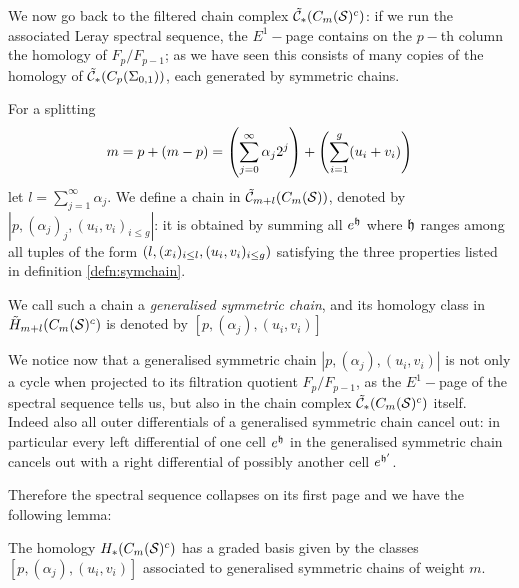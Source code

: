 We now go back to the filtered chain complex $\tilde{\mathcal{C}}_*(C_m(\mathcal{S})^c)$:
if we run the associated Leray spectral sequence,
the $E^1-$page contains on the $p-$th column the homology of $F_p/F_{p-1}$; as we have seen this consists of
many copies of the homology of $\tilde{\mathcal{C}}_*(C_p(\Sigma_{0,1}))$, each generated by symmetric chains.

\begin{defn}
\label{defn:gensymchain}
For a splitting
\[
 m=p+(m-p)=\left(\sum_{j=0}^{\infty}\alpha_j2^j\right)+\left(\sum_{i=1}^g(u_i+v_i)\right)
\]
let $l=\sum_{j=1}^{\infty}\alpha_j$. We define a chain in
$\tilde{\mathcal{C}}_{m+l}(C_m(\mathcal{S}))$, denoted by $|p,(\alpha_j)_j,(u_i,v_i)_{i\leq g}|$: it
is obtained by summing all $e^{\mathfrak{h}}$ where $\mathfrak{h}$
ranges among all tuples of the form $\left(l,(x_i)_{i\leq l},(u_i,v_i)_{i\leq g}\right)$
satisfying the three properties listed in definition \ref{defn:symchain}.

We call such a chain a
\emph{generalised symmetric chain}, and its homology class in $\tilde{H}_{m+l}(C_m(\mathcal{S})^c)$ is denoted
by $[p,(\alpha_j),(u_i,v_i)]$
\end{defn}

We notice now that a generalised symmetric chain $|p,(\alpha_j),(u_i,v_i)|$
is not only
a cycle when projected to its filtration quotient $F_p/F_{p-1}$, as the $E^1-$page
of the spectral sequence tells us, but also
in the chain complex $\tilde{\mathcal{C}}_*(C_m(\mathcal{S})^c)$ itself. Indeed also all outer
differentials of a generalised symmetric chain cancel out: in particular
every left differential
of one cell $e^{\mathfrak{h}}$ in the generalised symmetric chain cancels out with a right differential
of possibly another cell $e^{\mathfrak{h}'}$.

Therefore the spectral sequence collapses on its first page and
we have the following lemma:
\begin{lem}
\label{lem:gensymchain}
The homology $H_*(C_m(\mathcal{S})^c)$ has a graded basis given by the classes $[p,(\alpha_j),(u_i,v_i)]$
associated to generalised symmetric chains of weight $m$.
\end{lem}


